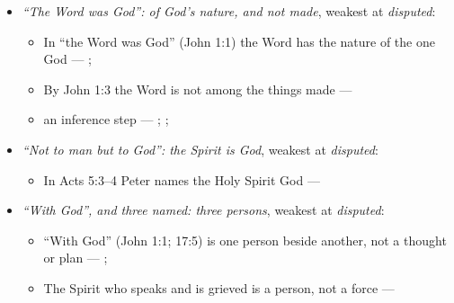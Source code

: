 \documentclass[11pt,paper=\testimonypaper,DIV=13,parskip=false]{scrartcl}
\begin{document}
\begin{itemize}
\begin{itemize}
\item “Firstborn of all creation” means the first thing God created --- \cite[14]{watchtower-should-you-believe-trinity-1989}
\item The holy spirit is God’s active force, personified, not a person --- \cite[20--23]{watchtower-should-you-believe-trinity-1989}
\item “With God” (John 1:1; 17:5) is one person beside another, not a thought or plan --- \cite[3, The Triune God]{kibbey-living-systematic-theology-2026}; \cite[27]{watchtower-should-you-believe-trinity-1989}
\item an inference step --- \cite[23]{watchtower-should-you-believe-trinity-1989}; \cite[122--123]{roberts-christendom-astray}
\end{itemize}
\item \emph{“The Word was God”: of God’s nature, and not made}, weakest at \emph{disputed}:
\begin{itemize}
\item In “the Word was God” (John 1:1) the Word has the nature of the one God --- \cite{harner-qualitative-anarthrous-1973}; \cite[3, The Triune God]{kibbey-living-systematic-theology-2026}
\item By John 1:3 the Word is not among the things made --- \cite[Tractates on John I.11]{schaff-nicene-post-nicene-fathers-1-7}
\item an inference step --- \cite[3, The Triune God]{kibbey-living-systematic-theology-2026}; \cite[ch. 4, Conclusion]{bernard-oneness-of-god-1983}; \cite[17--19]{buzzard-caveat-lector-2001}
\end{itemize}
\item \emph{“Not to man but to God”: the Spirit is God}, weakest at \emph{disputed}:
\begin{itemize}
\item In Acts 5:3–4 Peter names the Holy Spirit God --- \cite[198]{calvin-commentary-acts-1844}
\end{itemize}
\item \emph{“With God”, and three named: three persons}, weakest at \emph{disputed}:
\begin{itemize}
\item “With God” (John 1:1; 17:5) is one person beside another, not a thought or plan --- \cite[3, The Triune God]{kibbey-living-systematic-theology-2026}; \cite[27]{watchtower-should-you-believe-trinity-1989}
\item The Spirit who speaks and is grieved is a person, not a force --- \cite[3, The Triune God]{kibbey-living-systematic-theology-2026}

\end{itemize}
\end{itemize}
\end{document}
